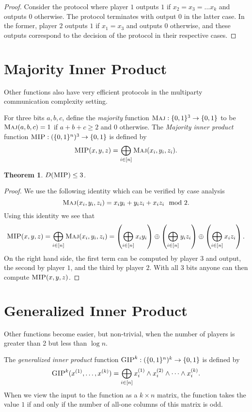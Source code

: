 \documentclass[11pt]{amsart}
\theoremstyle{plain}
\newtheorem{theorem}{Theorem}
\theoremstyle{definition}
\theoremstyle{plain}
\newcommand{\GIP}{\textsc{GIP}}
\newcommand{\Maj}{\textsc{Maj}}
\newcommand{\MIP}{\textsc{MIP}}
\begin{document}
\begin{proof}
Consider the protocol where player $1$ outputs $1$ if $x_2 = x_3 = \dots x_k$ and outputs $0$ otherwise. The protocol terminates with output $0$ in the latter case. In the former, player $2$ outputs $1$ if $x_1 = x_3$ and outputs $0$ otherwise, and these outputs correspond to the decision of the protocol in their respective cases.
\end{proof}



\newpage 
\section{Majority Inner Product}

Other functions also have very efficient protocols in the multiparty communication complexity setting. 

For three bits $a,b,c$, define the \emph{majority} function $\Maj : \{0,1\}^3 \to \{0,1\}$ to be $\Maj(a,b,c) = 1$ if $a+b+c \ge 2$ and $0$ otherwise. The \emph{Majority inner product} function $\MIP : (\{0,1\}^n)^3 \to \{0,1\}$ is defined by
\[
\MIP(x,y,z) = \bigoplus_{i \in [n]} \Maj(x_i,y_i,z_i).
\]
\begin{theorem}
$D(\MIP) \le 3$.
\end{theorem}

\begin{proof}
We use the following identity which can be verified by case analysis
$$\Maj(x_i,y_i,z_i) = x_iy_i + y_iz_i + x_iz_i \mod 2.$$
Using this identity we see that
$$\MIP(x,y,z) = \bigoplus_{i\in[n]}\Maj(x_i,y_i,z_i) = \left(\bigoplus_{i\in [n]} x_iy_i\right)\oplus\left(\bigoplus_{i\in [n]} y_iz_i\right)\oplus\left(\bigoplus_{i\in [n]} x_iz_i\right).$$
On the right hand side, the first term can be computed by player $3$ and output, the second by player $1$, and the third by player $2$. With all $3$ bits anyone can then compute $\MIP(x,y,z)$.
\end{proof}


\newpage 
\section{Generalized Inner Product}

Other functions become easier, but non-trivial, when the number of players is greater than 2 but less than $\log n$.

The \emph{generalized inner product} function $\GIP^k : (\{0,1\}^n)^k \to \{0,1\}$ is defined by
\[
\GIP^k(x^{(1)},\ldots,x^{(k)}) = \bigoplus_{i \in [n]} x^{(1)}_i \wedge x^{(2)}_i \wedge \cdots \wedge x^{(k)}_i.
\]
When we view the input to the function as a $k \times n$ matrix, the function takes the value $1$ if and only if the number of all-one columns of this matrix is odd. 
\end{document}
